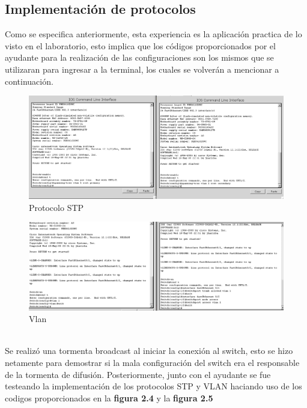 \documentclass[spanish]{udpreport}
\begin{document}
\subsection{Implementación de protocolos }
Como se especifica anteriormente, esta experiencia es la aplicación practica de lo visto en el laboratorio, esto implica que los códigos proporcionados por el ayudante para la realización de las configuraciones son los mismos que se utilizaran para ingresar a la terminal, los cuales se volverán a mencionar a continuación.
\begin{figure}[h]
    \centering
    \includegraphics[scale=0.3]{images/cod.png}
    \caption{Protocolo STP}
    \label{fig:my_label}
\end{figure}
\begin{figure}[h]
    \centering
    \includegraphics[scale=0.3]{images/3.png}
    \caption{Vlan}
    \label{fig:my_label}
\end{figure}
\\Se realizó una tormenta broadcast al iniciar la conexión al switch, esto se hizo netamente para demostrar si la mala configuración del switch era el responsable de la tormenta de difusión. Posteriormente, junto con el ayudante se fue testeando la implementación de los protocolos STP y VLAN haciando uso de los codigos proporcionados en la \textbf{figura 2.4} y la \textbf{figura 2.5}
\end{document}
